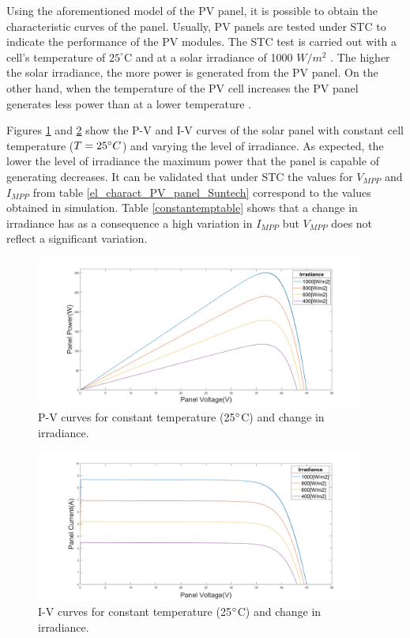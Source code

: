 Using the aforementioned model of the PV panel, it is possible to obtain the characteristic curves of the panel.  Usually, PV panels are tested under STC to indicate the performance of the PV modules. The STC test is carried out with a cell's temperature of $25^\circ$C and at a solar irradiance of 1000 $W/ m^2$ \cite{handbook}. The higher the solar irradiance, the more power is generated from the PV panel. On the other hand, when the temperature of the PV cell increases the PV panel generates less power than at a lower temperature \cite{handbook}. 

Figures \ref{fig:PVcurves_T25} and \ref{fig:IVcurves_T25} show the P-V and I-V curves of the solar panel with constant cell temperature ($T=25\dec C$) and varying the level of irradiance. 
As expected, the lower the level of irradiance the maximum power that the panel is capable of generating decreases. It can be validated that under STC the values for $V_{MPP}$ and $I_{MPP}$ from table \ref{el_charact_PV_panel_Suntech}  correspond to the values obtained in simulation. Table \ref{constantemptable} shows that a change in irradiance has as a consequence a high variation in $I_{MPP}$ but $V_{MPP}$ does not reflect a significant variation.  


\begin{figure}[H]
	\begin{center}
		\includegraphics[width=0.97\textwidth]{../Pictures/constant_temperature}
		\caption{P-V curves for constant temperature (25$\dec$C) and change in irradiance.}
		\label{fig:PVcurves_T25} 
	\end{center}	
\end{figure}

\begin{figure}[H]
	\begin{center}
		\includegraphics[width=0.97\textwidth]{../Pictures/constant_temperature_iv}
		\caption{I-V curves for constant temperature (25$\dec$C) and change in irradiance.}
		\label{fig:IVcurves_T25} 
	\end{center}	
\end{figure}


